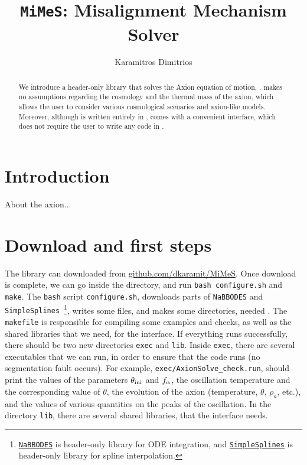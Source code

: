 \documentclass[11pt,a4paper]{article}
\author{Karamitros Dimitrios}
\title{{\tt MiMeS}: Misalignment Mechanism Solver}
\begin{document}
\maketitle

\begin{abstract}
	We introduce a \CPP header-only library that solves the Axion equation of motion, \mimes.  
	\mimes makes no assumptions regarding the cosmology and the thermal mass of the axion, which allows the user 
	to consider various cosmological scenarios and axion-like models.
	Moreover, although is written entirely in \CPP, \mimes comes with a convenient \PY interface, which does not require the
	user to write any code in \CPP.
\end{abstract}


\section{Introduction}\label{sec:intro}
\setcounter{equation}{0}

About the axion...



\section{Download and first steps}\label{sec:install}
\setcounter{equation}{0}

The library can downloaded from \href{https://github.com/dkaramit/MiMeS}{github.com/dkaramit/MiMeS}. Once download is complete, we can go inside the \mimes directory, and run {\tt bash configure.sh} and  {\tt make}.  The {\tt bash} script {\tt configure.sh}, downloads parts of {\tt NaBBODES} and {\tt SimpleSplines}~\footnote{\href{https://github.com/dkaramit/NaBBODES}{\tt NaBBODES} is header-only library for ODE integration, and \href{https://github.com/dkaramit/SimpleSplines}{\tt SimpleSplines} is header-only library for spline interpolation.}, writes some files, and  makes some directories, needed \mimes. The {\tt makefile} is responsible for compiling some examples and checks, as well as the shared libraries that we need, for the \PY interface.  If everything runs successfully, there should be two new directories {\tt exec} and {\tt lib}. Inside {\tt exec}, there are several executables that we can run, in order to ensure that the code runs (\eg no segmentation fault occurs). For example, {\tt exec/AxionSolve\_check.run}, should print the values of the parameters $\theta_{\rm ini}{}$ and $f_{\alpha}{}$, the oscillation temperature and the corresponding value of $\theta$, the evolution of the axion (\eg temperature, $\theta$, $\rho_a$, etc.), and the values of various quantities on the peaks of the oscillation.  In the directory {\tt lib}, there are several shared libraries, that the \PY interface needs.
\end{document}
